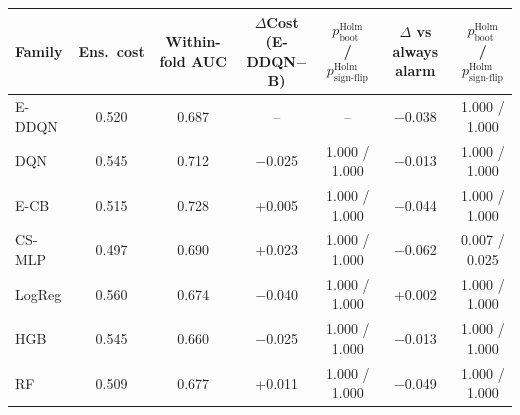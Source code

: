 \begin{tabular}{lcccccc}
\toprule
Family & Ens.\ cost & Within-fold AUC & $\Delta$Cost (E-DDQN$-$B) & $p_{\text{boot}}^{\text{Holm}}$ / $p_{\text{sign-flip}}^{\text{Holm}}$ & $\Delta$ vs always alarm & $p_{\text{boot}}^{\text{Holm}}$ / $p_{\text{sign-flip}}^{\text{Holm}}$ \\
\midrule
E-DDQN & 0.520 & 0.687 & -- & -- & $-$0.038 & 1.000 / 1.000 \\
DQN & 0.545 & 0.712 & $-$0.025 & 1.000 / 1.000 & $-$0.013 & 1.000 / 1.000 \\
E-CB & 0.515 & 0.728 & +0.005 & 1.000 / 1.000 & $-$0.044 & 1.000 / 1.000 \\
CS-MLP & 0.497 & 0.690 & +0.023 & 1.000 / 1.000 & $-$0.062 & 0.007 / 0.025 \\
LogReg & 0.560 & 0.674 & $-$0.040 & 1.000 / 1.000 & +0.002 & 1.000 / 1.000 \\
HGB & 0.545 & 0.660 & $-$0.025 & 1.000 / 1.000 & $-$0.013 & 1.000 / 1.000 \\
RF & 0.509 & 0.677 & +0.011 & 1.000 / 1.000 & $-$0.049 & 1.000 / 1.000 \\
\bottomrule
\end{tabular}
